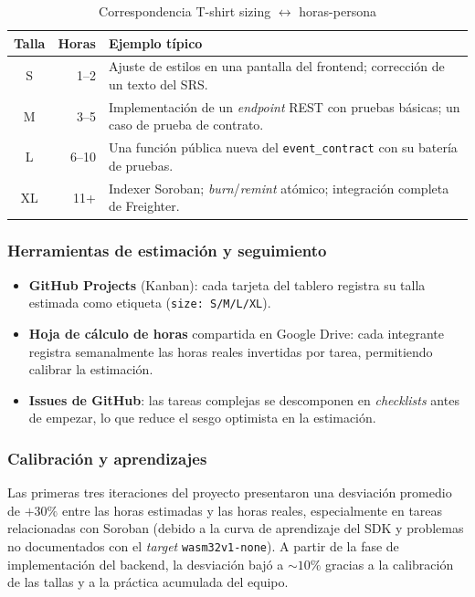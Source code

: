 \documentclass[12pt,oneside]{report}
\begin{document}
      \begin{table}[H]
        \centering
        \begin{tabular}{@{}c r p{8.0cm}@{}}
          \toprule
          \textbf{Talla} & \textbf{Horas} & \textbf{Ejemplo típico}\\
          \midrule
          S  & 1--2  & Ajuste de estilos en una pantalla del frontend; corrección de un texto del SRS.\\
          M  & 3--5  & Implementación de un \textit{endpoint} REST con pruebas básicas; un caso de prueba de contrato.\\
          L  & 6--10 & Una función pública nueva del \texttt{event\_contract} con su batería de pruebas.\\
          XL & 11+   & Indexer Soroban; \textit{burn}/\textit{remint} atómico; integración completa de Freighter.\\
          \bottomrule
        \end{tabular}
        \caption{Correspondencia T-shirt sizing $\leftrightarrow$ horas-persona}
        \label{tab:tshirt-sizing}
      \end{table}

      \subsubsection{Herramientas de estimación y seguimiento}
      \begin{itemize}
        \item \textbf{GitHub Projects} (Kanban): cada tarjeta del tablero registra su talla estimada como etiqueta (\texttt{size: S/M/L/XL}).
        \item \textbf{Hoja de cálculo de horas} compartida en Google Drive: cada integrante registra semanalmente las horas reales invertidas por tarea, permitiendo calibrar la estimación.
        \item \textbf{Issues de GitHub}: las tareas complejas se descomponen en \textit{checklists} antes de empezar, lo que reduce el sesgo optimista en la estimación.
      \end{itemize}

      \subsubsection{Calibración y aprendizajes}
      Las primeras tres iteraciones del proyecto presentaron una desviación promedio de $+30\%$ entre las horas estimadas y las horas reales, especialmente en tareas relacionadas con Soroban (debido a la curva de aprendizaje del SDK y problemas no documentados con el \textit{target} \texttt{wasm32v1-none}). A partir de la fase de implementación del backend, la desviación bajó a $\sim$$10\%$ gracias a la calibración de las tallas y a la práctica acumulada del equipo.
\end{document}

